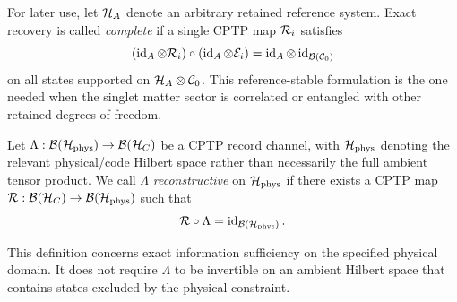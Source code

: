 For later use, let $\mathcal H_A$ denote an arbitrary retained reference system.  Exact recovery is called \emph{complete} if a single CPTP map $\mathcal R_i$ satisfies
\begin{equation}
  (\operatorname{id}_A\otimes\mathcal R_i)
  \circ
  (\operatorname{id}_A\otimes\mathcal E_i)
  =\operatorname{id}_A\otimes\operatorname{id}_{\mathcal B(\mathcal C_0)}
  \label{eq:complete-recovery}
\end{equation}
on all states supported on $\mathcal H_A\otimes\mathcal C_0$.  This reference-stable formulation is the one needed when the singlet matter sector is correlated or entangled with other retained degrees of freedom.

\begin{definition}
Let $\Lambda:\mathcal B(\mathcal H_{\mathrm{phys}})\to\mathcal B(\mathcal H_C)$ be a CPTP record channel, with $\mathcal H_{\mathrm{phys}}$ denoting the relevant physical/code Hilbert space rather than necessarily the full ambient tensor product.  We call $\Lambda$ \emph{reconstructive} on $\mathcal H_{\mathrm{phys}}$ if there exists a CPTP map $\mathcal R:\mathcal B(\mathcal H_C)\to\mathcal B(\mathcal H_{\mathrm{phys}})$ such that
\begin{equation}
  \mathcal R\circ\Lambda=\operatorname{id}_{\mathcal B(\mathcal H_{\mathrm{phys}})}.
\end{equation}
\end{definition}

This definition concerns exact information sufficiency on the specified physical domain.  It does not require $\Lambda$ to be invertible on an ambient Hilbert space that contains states excluded by the physical constraint.
